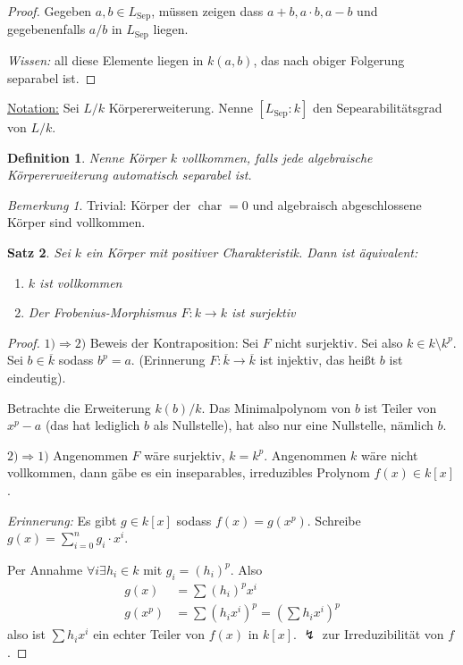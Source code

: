 \documentclass[a4paper,12pt,numbers=noenddot,parskip=full]{scrartcl}
\newcommand{\heading}{\underline}
\theoremstyle{dotless}
\newtheorem{theorem}{Satz}[section]
\newtheorem{definition}[theorem]{Definition}
\theoremstyle{remark}
\newtheorem*{remark}{Bemerkung}
\begin{document}
	\begin{proof}
		Gegeben $a,b \in L_\text{Sep}$, müssen zeigen dass $a + b, a \cdot b, a - b$ und gegebenenfalls $a/b$ in $L_\text{Sep}$ liegen.
		
		\textit{Wissen:} all diese Elemente liegen in $k(a,b)$, das nach obiger Folgerung separabel ist.
	\end{proof}

	\heading{Notation:} Sei $L/k$ Körpererweiterung. Nenne $[L_\text{Sep}: k]$ den Sepearabilitätsgrad von $L/k$.
	
	\begin{definition}
		Nenne Körper $k$ vollkommen, falls jede algebraische Körpererweiterung automatisch separabel ist.
	\end{definition}

	\begin{remark}
		Trivial: Körper der $\operatorname{char} = 0$ und algebraisch abgeschlossene Körper sind vollkommen.
	\end{remark}

	\begin{theorem}
		Sei $k$ ein Körper mit positiver Charakteristik. Dann ist äquivalent:
		\begin{enumerate}
			\item $k$ ist vollkommen
			\item Der Frobenius-Morphismus $F: k \to k$ ist surjektiv
		\end{enumerate}
	\end{theorem}
	\begin{proof}
		\heading{$1) \Rightarrow 2)$} Beweis der Kontraposition: Sei $F$ nicht surjektiv. Sei also $k \in k \setminus k^p$. Sei $b \in \overline{k}$ sodass $b^p = a$. (Erinnerung $F: \overline{k} \to \overline{k}$ ist injektiv, das heißt $b$ ist eindeutig).
		
		Betrachte die Erweiterung $k(b)/k$. Das Minimalpolynom von $b$ ist Teiler von $x^p - a$ (das hat lediglich $b$ als Nullstelle), hat also nur eine Nullstelle, nämlich $b$.
		
		\heading{$2) \Rightarrow 1)$} Angenommen $F$ wäre surjektiv, $k = k^p$. Angenommen $k$ wäre nicht vollkommen, dann gäbe es ein inseparables, irreduzibles Prolynom $f(x) \in k[x]$.
		
		\textit{Erinnerung:} Es gibt $g \in k[x]$ sodass $f(x) = g(x^p)$. Schreibe $g(x) = \sum_{i=0}^n g_i \cdot x^i$.
		
		Per Annahme $\forall i \exists h_i \in k$ mit $g_i = (h_i)^p$. Also
		\begin{align*}
			g(x) &= \sum (h_i)^p x^i \\
			g(x^p) &= \sum (h_i x^i)^p = \left( \sum h_i x^i \right)^p
		\end{align*}
		also ist $\sum h_i x^i$ ein echter Teiler von $f(x)$ in $k[x]$. $\lightning$ zur Irreduzibilität von $f$.
	\end{proof}
\end{document}
